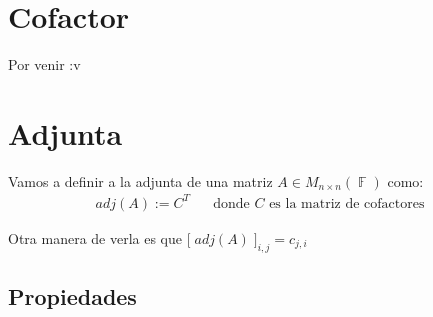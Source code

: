 \documentclass[12pt, fleqn]{report}                             %
\DeclareMathOperator \Space     {\quad}                         %
\theoremstyle{break}                                            %
\DeclareMathOperator \GenericField {\mathbb{F}}                 %
\newcommand{\BigBrackets}[1]    {\Big[ \; #1 \; \Big]}          %
\begin{document}
        \section{Cofactor}

            Por venir :v



        \clearpage
        \section{Adjunta}

            Vamos a definir a la adjunta de una matriz $A \in M_{n \times n}(\GenericField)$
            como:
            \begin{align*}
                adj(A) := C^T \Space \text{donde $C$ es la matriz de cofactores}     
            \end{align*} 

            Otra manera de verla es que $\BigBrackets{adj(A)}_{i, j} = c_{j, i}$


            \vspace{1em}
            \subsection{Propiedades}
\end{document}
